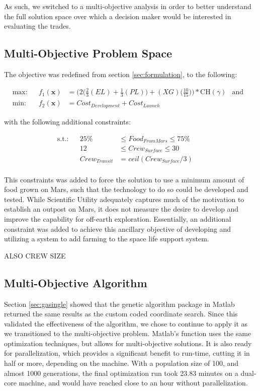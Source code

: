 \documentclass[]{aiaa-pretty}
\begin{document}
As such, we switched to a multi-objective analysis in order to better understand the full solution space over which a decision maker would be interested in evaluating the trades.

\subsection{Multi-Objective Problem Space}
\label{sec:multiprob}
The objective was redefined from section \ref{sec:formulation}, to the following:

\begin{align*}
\label{eqn:mulitobj}
\mbox{max:}& &f_1(\boldsymbol{x})&=\bigg(2\bigg(\frac{2}{3}(EL)+\frac{1}{3}(PL)\bigg)+ (XG)\bigg(\frac{10}{15}\bigg)\bigg)*\text{CH}(\gamma)& \text{and}& \\
\mbox{min:}& &f_2(\boldsymbol{x})&=Cost_{Development}+Cost_{Launch} & &
\end{align*}

 with the following additional constraints:
 
\begin{align*}
\mbox{s.t.:}& & 25\%&\leq Food_{From Mars}\leq 75\% & &\\
& & 12 &\leq Crew_{Surface} \leq 30 & &\\
& & Crew_{Transit}&=ceil(Crew_{Surface}/3)& &\\
\end{align*}

This constraints was added to force the solution to use a minimum amount of food grown on Mars, such that the technology to do so could be developed and tested. While Scientific Utility adequately captures much of the motivation to establish an outpost on Mars, it does not measure the desire to develop and improve the capability for off-earth exploration. Essentially, an additional constraint was added to achieve this ancillary objective of developing and utilizing a system to add farming to the space life support system.

ALSO CREW SIZE
\subsection{Multi-Objective Algorithm}
Section \ref{sec:gasingle} showed that the genetic algorithm package in Matlab returned the same results as the custom coded coordinate search.  Since this validated the effectiveness of the  algorithm, we chose to continue to apply it as we transitioned to the multi-objective problem.  Matlab's  function uses the same optimization techniques, but allows for multi-objective solutions.  It is also ready for parallelization, which provides a significant benefit to run-time, cutting it in half or more, depending on the machine. With a population size of 100, and almost 1000 generations, the final optimization run took 23.83 minutes on a dual-core machine, and would have reached close to an hour without parallelization.
\end{document}
